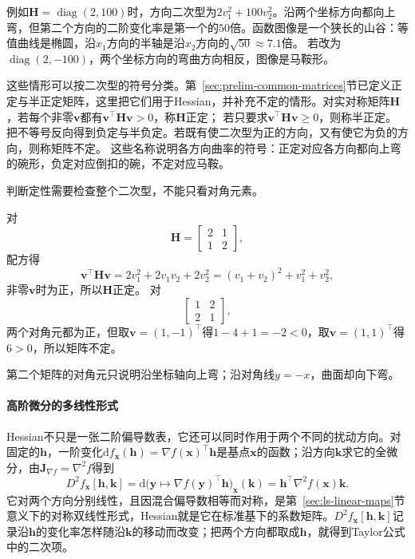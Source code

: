 例如$\bm H=\operatorname{diag}(2,100)$时，方向二次型为$2v_1^2+100v_2^2$。沿两个坐标方向都向上弯，但第二个方向的二阶变化率是第一个的$50$倍。函数图像是一个狭长的山谷：等值曲线是椭圆，沿$x_1$方向的半轴是沿$x_2$方向的$\sqrt{50}\approx7.1$倍。
若改为$\operatorname{diag}(2,-100)$，两个坐标方向的弯曲方向相反，图像是马鞍形。

这些情形可以按二次型的符号分类。第~\ref{sec:prelim-common-matrices}节已定义正定与半正定矩阵，这里把它们用于Hessian，并补充不定的情形。对实对称矩阵$\bm H$，若每个非零$\bm v$都有$\bm v^\top\bm H\bm v>0$，称$\bm H$正定；
若只要求$\bm v^\top\bm H\bm v\geq0$，则称半正定。
把不等号反向得到负定与半负定。若既有使二次型为正的方向，又有使它为负的方向，则称矩阵不定。
这些名称说明各方向曲率的符号：正定对应各方向都向上弯的碗形，负定对应倒扣的碗，不定对应马鞍。

判断定性需要检查整个二次型，不能只看对角元素。
\begin{example}[用二次型判断Hessian的定性]
\label{ex:multivariable-hessian-definiteness}
对
\[
 \bm H=\begin{bmatrix}2&1\\1&2\end{bmatrix},
\]
配方得
\[
 \bm v^\top\bm H\bm v=2v_1^2+2v_1v_2+2v_2^2=(v_1+v_2)^2+v_1^2+v_2^2,
\]
非零$\bm v$时为正，所以$\bm H$正定。
对
\[
 \begin{bmatrix}1&2\\2&1\end{bmatrix},
\]
两个对角元都为正，但取$\bm v=(1,-1)^\top$得$1-4+1=-2<0$，取$\bm v=(1,1)^\top$得$6>0$，所以矩阵不定。
\end{example}

第二个矩阵的对角元只说明沿坐标轴向上弯；沿对角线$y=-x$，曲面却向下弯。

\paragraph{高阶微分的多线性形式}

Hessian不只是一张二阶偏导数表，它还可以同时作用于两个不同的扰动方向。对固定的$\bm h$，一阶变化$\mathrm df_{\bm x}(\bm h)=\nabla f(\bm x)^\top\bm h$是基点$\bm x$的函数；沿方向$\bm k$求它的全微分，由$\bm J_{\nabla f}=\nabla^2f$得到
\[
 D^2f_{\bm x}[\bm h,\bm k]
 =\mathrm d\bigl(\bm y\mapsto\nabla f(\bm y)^\top\bm h\bigr)_{\bm x}(\bm k)
 =\bm h^\top\nabla^2f(\bm x)\bm k .
\]
它对两个方向分别线性，且因混合偏导数相等而对称，是第~\ref{sec:ls-linear-maps}节意义下的对称双线性形式，Hessian就是它在标准基下的系数矩阵。$D^2f_{\bm x}[\bm h,\bm k]$记录沿$\bm h$的变化率怎样随沿$\bm k$的移动而改变；把两个方向都取成$\bm h$，就得到Taylor公式中的二次项。

